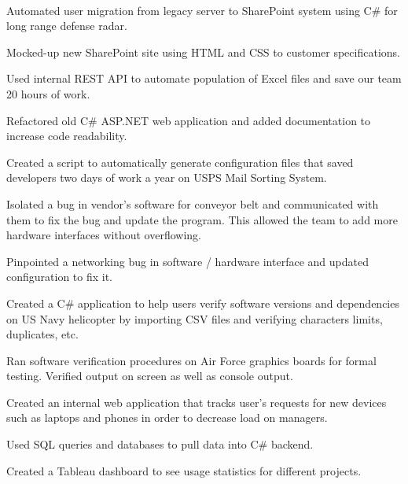 \documentclass[]{deedy-resume-openfont}
\begin{document}
\hfill {} \\
\begin{tightemize}
	\item Automated user migration from legacy server to SharePoint system using C\# for long range defense radar.
	\item Mocked-up new SharePoint site using HTML and CSS to customer specifications.
	\item Used internal REST API to automate population of Excel files and save our team 20 hours of work.
	\item Refactored old C\# ASP.NET web application and added documentation to increase code readability.
\end{tightemize}
\begin{tightemize}
	\item Created a script to automatically generate configuration files that saved developers two days of work a year on USPS Mail Sorting System.
	\item Isolated a bug in vendor's software for conveyor belt and communicated with them to fix the bug and update the program. This allowed the team to add more hardware interfaces without overflowing. 
	\item Pinpointed a networking bug in software / hardware interface and updated configuration to fix it.
\end{tightemize}
\begin{tightemize}
	\item Created a C\# application to help users verify software versions and dependencies on US Navy helicopter by importing CSV files and verifying characters limits, duplicates, etc.
	\item Ran software verification procedures on Air Force graphics boards for formal testing. Verified output on screen as well as console output.
\end{tightemize}
\begin{tightemize}
	\item Created an internal web application that tracks user’s requests for new devices such as laptops and phones in order to decrease load on managers.
	\item Used SQL queries and databases to pull data into C\# backend.
	\item Created a Tableau dashboard to see usage statistics for different projects.
\end{tightemize}
\sectionsep
\hrulefill
\end{document}
